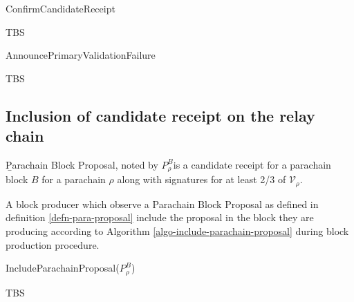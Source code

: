 \begin{algorithm}
  \caption[]{\sc ConfirmCandidateReceipt}
  \label{algo-endorse-candidate-receipt}
  \begin{algorithmic}[1]
    \Require{}

    \State TBS
  \end{algorithmic}
\end{algorithm}

\begin{algorithm}
  \caption[]{\sc AnnouncePrimaryValidationFailure}
  \label{algo-announce-primary-validation-failure}
  \begin{algorithmic}[1]
    \Require{}

    \State TBS
  \end{algorithmic}
\end{algorithm}

\subsection{Inclusion of candidate receipt on the relay chain}\label{sect-inclusion-of-candidate-receipt}

\begin{definition}
  \label{defn-para-proposal}
        {\b Parachain Block Proposal}, noted by $P^B_{\rho}$is a candidate receipt for a parachain block $B$ for a parachain $\rho$ along with signatures for at least 2/3 of $\mathcal{V}_\rho$.  %

\end{definition}

A block producer which observe a Parachain Block Proposal as defined in definition \ref{defn-para-proposal}  include the proposal in the block they are producing according to Algorithm \ref{algo-include-parachain-proposal} during block production procedure.

\begin{algorithm}
  \caption[]{\sc IncludeParachainProposal($P^B_{\rho}$)}
  \label{algo-include-parachain-proposal}
  \begin{algorithmic}[1]
    \Require{}

    \State TBS
  \end{algorithmic}
\end{algorithm}


